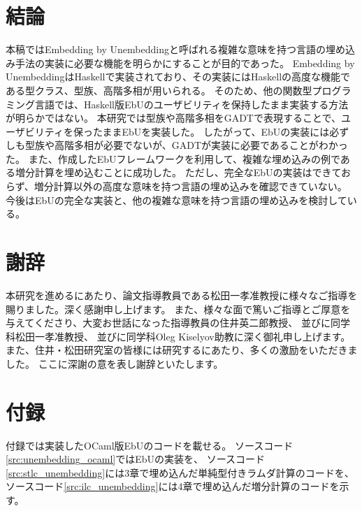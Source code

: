 \documentclass[uplatex]{sumiilab-paper}
\theoremstyle{mystyle}
\numberwithin{definition}{chapter} %
\begin{document}
\chapter{結論}
本稿ではEmbedding by Unembedding\cite{matsuda2023embedding}と呼ばれる複雑な意味を持つ言語の埋め込み手法の実装に必要な機能を明らかにすることが目的であった。
Embedding by UnembeddingはHaskellで実装されており、その実装にはHaskellの高度な機能である型クラス、型族、高階多相が用いられる。
そのため、他の関数型プログラミング言語では、Haskell版EbUのユーザビリティを保持したまま実装する方法が明らかではない。
本研究では型族や高階多相をGADTで表現することで、ユーザビリティを保ったままEbUを実装した。
したがって、EbUの実装には必ずしも型族や高階多相が必要でないが、GADTが実装に必要であることがわかった。
また、作成したEbUフレームワークを利用して、複雑な埋め込みの例である増分計算を埋め込むことに成功した。
ただし、完全なEbUの実装はできておらず、増分計算以外の高度な意味を持つ言語の埋め込みを確認できていない。
今後はEbUの完全な実装と、他の複雑な意味を持つ言語の埋め込みを検討している。

\backmatter%
\chapter{謝辞}
本研究を進めるにあたり、論文指導教員である松田一孝准教授に様々なご指導を賜りました。深く感謝申し上げます。
また、様々な面で篤いご指導とご厚意を与えてくださり、大変お世話になった指導教員の住井英二郎教授、
並びに同学科松田一孝准教授、
並びに同学科Oleg Kiselyov助教に深く御礼申し上げます。
また、住井・松田研究室の皆様には研究するにあたり、多くの激励をいただきました。
ここに深謝の意を表し謝辞といたします。




\appendix%
\chapter{付録}
付録では実装したOCaml版EbUのコードを載せる。
ソースコード\ref{src:unembedding_ocaml}ではEbUの実装を、
ソースコード\ref{src:stlc_unembedding}には3章で埋め込んだ単純型付きラムダ計算のコードを、
ソースコード\ref{src:ilc_unembedding}には4章で埋め込んだ増分計算のコードを示す。
\end{document}
